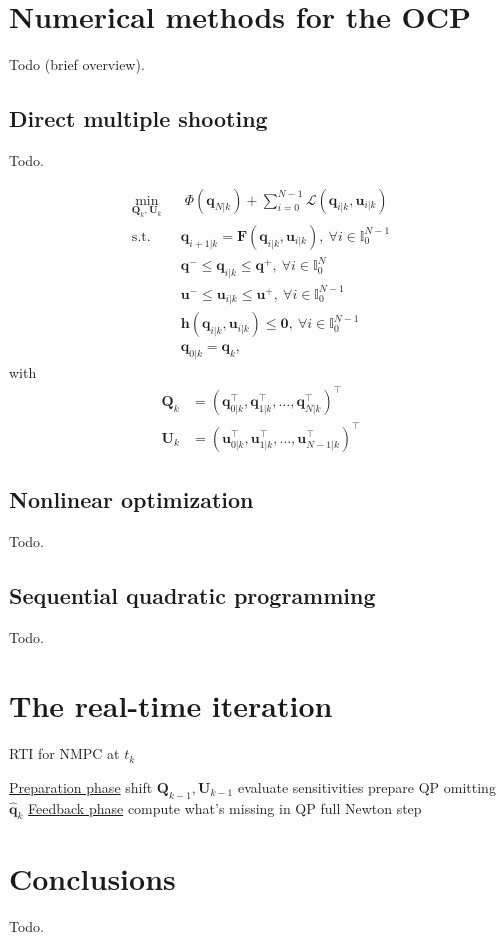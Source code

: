 \section{Numerical methods for the OCP}
Todo (brief overview).

\subsection{Direct multiple shooting}
Todo.

\begin{equation*}
    \label{eq:transcribed-OCP}
    \begin{aligned}
        \min_{\bm{Q}_k, \bm{U}_k} \;\;
            & \; \Phi(\bm{q}_{N|k}) + \sum_{i=0}^{N-1} \mathcal{L}(\bm{q}_{i|k}, \bm{u}_{i|k}) \\
            \text{s.t. } & \bm{q}_{i+1|k} = \bm{F}(\bm{q}_{i|k}, \bm{u}_{i|k}), \ \forall i \in \mathbb{I}_{0}^{N-1} \\
                         & \bm{q}^- \le \bm{q}_{i|k} \le \bm{q}^+, \ \forall i \in \mathbb{I}_{0}^{N} \\
                         & \bm{u}^- \le \bm{u}_{i|k} \le \bm{u}^+, \ \forall i \in \mathbb{I}_{0}^{N-1} \\
                         & \bm{h}(\bm{q}_{i|k}, \bm{u}_{i|k}) \le \bm{0}, \ \forall i \in \mathbb{I}_{0}^{N-1} \\
                         & \bm{q}_{0|k} = \bm{q}_k,
    \end{aligned}
\end{equation*}
with
\begin{align*}
\bm{Q}_k &= (\bm{q}_{0|k}^\top, \bm{q}_{1|k}^\top, \dots, \bm{q}_{N|k}^\top)^\top \\
\bm{U}_k &= (\bm{u}_{0|k}^\top, \bm{u}_{1|k}^\top, \dots, \bm{u}_{N-1|k}^\top)^\top
\end{align*}

\subsection{Nonlinear optimization}
Todo.

\subsection{Sequential quadratic programming}
Todo.

\section{The real-time iteration}
\begin{algorithm}
	\small
	\caption{RTI for NMPC at $t_k$}
	\label{alg:RTI}
    \underline{Preparation phase}\;
    shift $\bm{Q}_{k-1}, \bm{U}_{k-1}$\;
    evaluate sensitivities\;
    prepare QP omitting $\hat{\bm{q}}_k$\;
    \;
    \underline{Feedback phase}\;
    compute what's missing in QP\;
    full Newton step\;
    \;
\end{algorithm}

\section{Conclusions}
Todo.